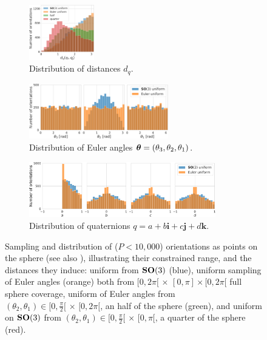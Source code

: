 \begin{figure}[ht!]
\begin{minipage}{.65\linewidth}
\begin{subfigure}[b]{0.37\linewidth}
            \includegraphics[height=2.4cm]{figures/dQ_distribution_coverage.pdf}
            \caption{Distribution of distances $d_q$.}%
            \label{fig:orientation-sampling:distances}
            \vspace{0.2cm}
        \end{subfigure}
        \hfill
        \begin{subfigure}[b]{0.6\linewidth}
            \centering
            \includegraphics[height=2.4cm]{figures/uniform_quaternions_vs_angles_ang.pdf}
            \caption{Distribution of Euler angles ${\boldsymbol{\theta}} = (\theta_3,\theta_2,\theta_1)$.}%
            \label{fig:distribution-angles}
            \vspace{0.2cm}
        \end{subfigure}
        \begin{subfigure}[b]{0.97\linewidth}
            \centering
            \includegraphics[height=2.4cm]{figures/uniform_quaternions_vs_angles_q.pdf}
            \caption{Distribution of quaternions $q = a + b\boldsymbol{i} + c\boldsymbol{j} + d\boldsymbol{k}$.}%
            \label{fig:distribution-quaternions}
        \end{subfigure}
    \end{minipage}
    \caption{%
        Sampling and distribution of ($P < 10,000$) orientations as points on the sphere (see also ), illustrating their constrained range, and the distances they induce: uniform from $\mathrm{\mathbf{SO}}(3)$ (blue), uniform sampling of Euler angles (orange) both from $[0,2\pi[ \, \times \, [0,\pi] \times [0,2\pi[$ full sphere coverage, uniform of Euler angles from $(\theta_2, \theta_1) \in [0,\frac{\pi}{2}[ \, \times \, [0,2\pi[$, an half of the sphere (green), and uniform on $\mathrm{\mathbf{SO}}(3)$ from $(\theta_2, \theta_1) \in [0,\frac{\pi}{2}[ \, \times \, [0,\pi[$, a quarter of the sphere (red).
    }
\end{figure}

